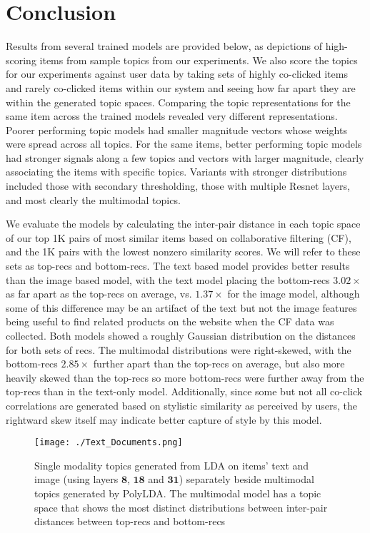 \documentclass[10pt,twocolumn,letterpaper]{article}
\begin{document}
\section{Conclusion}
Results from several trained models are provided below, as depictions of high-scoring items from sample topics from our experiments.  We also score the topics for our experiments against user data by taking sets of highly co-clicked items and rarely co-clicked items within our system and seeing how far apart they are within the generated topic spaces. Comparing the topic representations for the same item across the trained models revealed very different representations. Poorer performing topic models had smaller magnitude vectors whose weights were spread across all topics. For the same items, better performing topic models had stronger signals along a few topics and vectors with larger magnitude, clearly associating the items with specific topics. Variants with stronger distributions included those with secondary thresholding, those with multiple Resnet layers, and most clearly the multimodal topics.

We evaluate the models by calculating the inter-pair distance in each topic space of our top 1K pairs of most similar items based on collaborative filtering (CF), and the 1K pairs with the lowest nonzero similarity scores. We will refer to these sets as top-recs and bottom-recs. The text based model provides better results than the image based model, with the text model placing the bottom-recs $3.02\times$ as far apart as the top-recs on average, vs. $1.37\times$ for the image model, although some of this difference may be an artifact of the text but not the image features being useful to find related products on the website when the CF data was collected. Both models showed a roughly Gaussian distribution on the distances for both sets of recs. The multimodal distributions were right-skewed, with the bottom-recs $2.85\times$ further apart than the top-recs on average, but also more heavily skewed than the top-recs so more bottom-recs were further away from the top-recs than in the text-only model. Additionally, since some but not all co-click correlations are generated based on stylistic similarity as perceived by users, the rightward skew itself may indicate better capture of style by this model. 



\begin{figure*}[t]
\centering
\texttt{[image: ./Text\_Documents.png]}
\caption{Single modality topics generated from LDA on items' text and image (using layers $\mathbf{8}$, $\mathbf{18}$ and $\mathbf{31}$) separately beside multimodal topics generated by PolyLDA. The multimodal model has a topic space that shows the most distinct distributions between inter-pair distances between top-recs and bottom-recs}
\label{fig:Multimodal_Topics}
\end{figure*}
\end{document}
